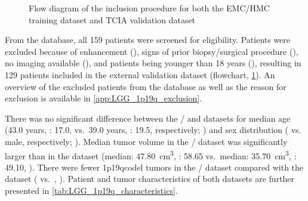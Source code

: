 \begin{figure}
\centering

\caption{Flow diagram of the inclusion procedure for both the \acrshort{EMC}/\acrshort{HMC} training dataset and \acrshort{TCIA} validation dataset}\label{fig:LGG_1p19q_flowchart}
\end{figure}


From the  database, all 159 patients were screened for eligibility.
Patients were excluded because of enhancement (), signs of prior biopsy/surgical procedure (), no  imaging available (), and patients being younger than 18 years (), resulting in 129 patients included in the external validation dataset (flowchart, \cref{fig:LGG_1p19q_flowchart}).
An overview of the excluded patients from the  database as well as the reason for exclusion is available in \cref{app:LGG_1p19q_exclusion}.

There was no significant difference between the / and  datasets for median age (\num{43.0} years, : \num{17.0}, vs.\ \num{39.0} years, : \num{19.5}, respectively; ) and sex distribution ( vs.\  male, respectively; ).
Median \gls{tumor} volume in the / dataset was significantly larger than in the  dataset (median: \SI{47.80}{\centi\meter\cubed}, : \num{58.65} vs.\ median: \SI{35.70}{\centi\meter\cubed}, : \num{49.10}, ).
There were fewer \acl{1p19qcodel} \glspl{tumor} in the / dataset compared with the  dataset ( vs.\ , ).
Patient and \gls{tumor} characteristics of both datasets are further presented in \cref{tab:LGG_1p19q_characteristics}.


